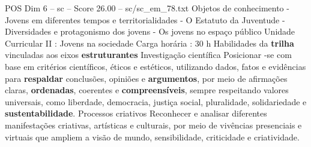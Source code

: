 \begin{textsample}{POS Dim 6 – sc – Score 26.00 – sc/sc\_em\_78.txt}
Objetos de conhecimento - Jovens em diferentes tempos e territorialidades - O Estatuto da Juventude - Diversidades e protagonismo dos jovens - Os jovens no espaço público Unidade Curricular II : Jovens na sociedade Carga horária : 30 h Habilidades da \textbf{trilha} vinculadas aos eixos \textbf{estruturantes} Investigação científica Posicionar -se com base em critérios científicos, éticos e estéticos, utilizando dados, fatos e evidências para \textbf{respaldar} conclusões, opiniões e \textbf{argumentos}, por meio de afirmações claras, \textbf{ordenadas}, coerentes e \textbf{compreensíveis}, sempre respeitando valores universais, como liberdade, democracia, justiça social, pluralidade, solidariedade e \textbf{sustentabilidade}.
Processos criativos Reconhecer e analisar diferentes manifestações criativas, artísticas e culturais, por meio de vivências presenciais e virtuais que ampliem a visão de mundo, sensibilidade, criticidade e criatividade.

\end{textsample}
